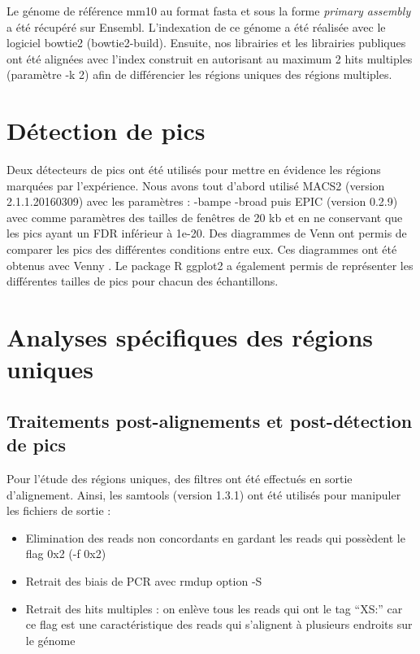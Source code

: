 \documentclass[a4paper,12pt,times]{report}
\begin{document}
    Le génome de référence mm10 au format fasta et sous la forme \textit{primary assembly} a été récupéré sur Ensembl. L'indexation de ce génome a été réalisée avec le logiciel bowtie2 (bowtie2-build).
    Ensuite, nos librairies et les librairies publiques ont été alignées avec l'index construit en autorisant au maximum 2 hits multiples (paramètre -k 2) afin de différencier les régions uniques des régions multiples.

  
     \section{Détection de pics}
Deux détecteurs de pics ont été utilisés pour mettre en évidence les régions marquées par l'expérience. Nous avons tout d'abord utilisé  MACS2 \cite{MACS} (version 2.1.1.20160309)  avec les paramètres : -bampe -broad puis EPIC \cite{SICER} (version 0.2.9) avec comme paramètres des tailles de fenêtres de 20 kb et en ne conservant que les pics ayant un FDR inférieur à 1e-20.
\newline
Des diagrammes de Venn ont permis de comparer les pics des différentes conditions entre eux. Ces diagrammes ont été obtenus avec Venny \cite{Venn}.
Le package R ggplot2 a également permis de représenter les différentes tailles de pics pour chacun des échantillons.
    

   \section{Analyses spécifiques des régions uniques}
   \subsection{Traitements post-alignements et post-détection de pics}
       Pour l'étude des régions uniques, des filtres ont été effectués en sortie d'alignement. Ainsi, les samtools (version 1.3.1) ont été utilisés pour manipuler les fichiers de sortie :


\begin{itemize}
\item Elimination des reads non concordants en gardant les reads qui possèdent le flag 0x2 (-f 0x2)
\item Retrait des biais de PCR avec rmdup option -S
\item Retrait des hits multiples  : on enlève tous les reads qui ont le tag ``XS:''  car ce flag est une caractéristique des reads qui s'alignent à plusieurs endroits sur le génome
\end{itemize}
\end{document}

